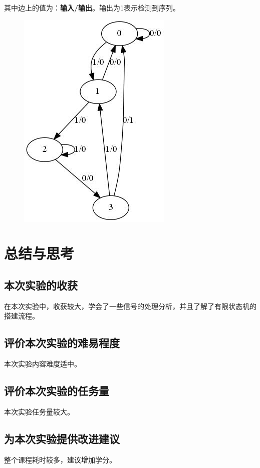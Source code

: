\documentclass[UTF8]{article}
\begin{document}
	其中边上的值为：\textbf{输入/输出}。输出为1表示检测到序列。
	\begin{figure}[H]
		\centering
		\includegraphics[width=0.5\linewidth]{e4_state_graph.jpg}
		\label{e4_state_graph}
	\end{figure}\par

	
	
	\section{总结与思考}	
	\subsection{本次实验的收获}
	在本次实验中，收获较大，学会了一些信号的处理分析，并且了解了有限状态机的搭建流程。\par
	
	\subsection{评价本次实验的难易程度}
	本次实验内容难度适中。\par
	
	\subsection{评价本次实验的任务量}
	本次实验任务量较大。\par
	
	\subsection{为本次实验提供改进建议}
	整个课程耗时较多，建议增加学分。\par
	
	
\end{document}
